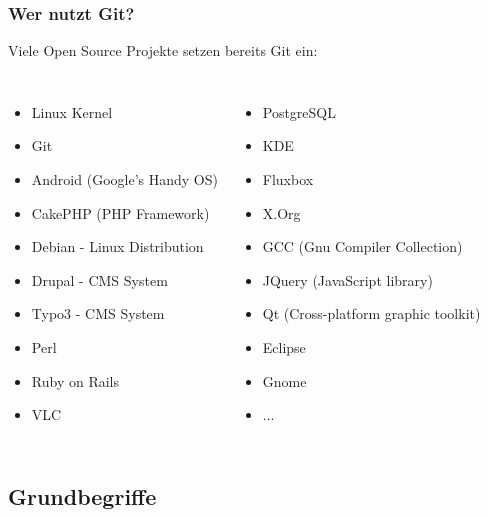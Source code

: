 \documentclass{beamer}
\begin{document}
\begin{frame}\frametitle{Wer nutzt Git?}
Viele Open Source Projekte setzen bereits Git ein:

\begin{columns}
                \begin{itemize}                
					\item Linux Kernel
					\item Git
					\item Android (Google's Handy OS) 
					\item CakePHP (PHP Framework) 
					\item Debian - Linux Distribution
					\item Drupal - CMS System
					\item Typo3 - CMS System
					\item Perl
					\item Ruby on Rails
	                \item VLC
                \end{itemize}
                \begin{itemize}
                \item PostgreSQL
                \item KDE
                \item Fluxbox
                \item X.Org
                \item GCC (Gnu Compiler Collection)
                \item JQuery (JavaScript library) 
                \item Qt (Cross-platform graphic toolkit)
                \item Eclipse
                \item Gnome
                \item ...
                \end{itemize}
\end{columns}

\end{frame}

\subsection{Grundbegriffe}
\end{document}
